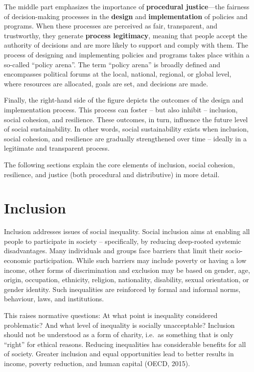 \documentclass[
  a4paper,
  openany]{book}
\begin{document}
The middle part emphasizes the importance of \textbf{procedural
justice}---the fairness of decision-making processes in the
\textbf{design} and \textbf{implementation} of policies and programs.
When these processes are perceived as fair, transparent, and
trustworthy, they generate \textbf{process legitimacy}, meaning that
people accept the authority of decisions and are more likely to support
and comply with them. The process of designing and implementing policies
and programs takes place within a so-called ``policy arena''. The term
``policy arena'' is broadly defined and encompasses political forums at
the local, national, regional, or global level, where resources are
allocated, goals are set, and decisions are made.

Finally, the right-hand side of the figure depicts the outcomes of the
design and implementation process. This process can foster -- but also
inhibit -- inclusion, social cohesion, and resilience. These outcomes,
in turn, influence the future level of social sustainability. In other
words, social sustainability exists when inclusion, social cohesion, and
resilience are gradually strengthened over time -- ideally in a
legitimate and transparent process.

The following sections explain the core elements of inclusion, social
cohesion, resilience, and justice (both procedural and distributive) in
more detail.

\section{Inclusion}\label{inclusion}

Inclusion addresses issues of social inequality. Social inclusion aims
at enabling all people to participate in society -- specifically, by
reducing deep-rooted systemic disadvantages. Many individuals and groups
face barriers that limit their socio-economic participation. While such
barriers may include poverty or having a low income, other forms of
discrimination and exclusion may be based on gender, age, origin,
occupation, ethnicity, religion, nationality, disability, sexual
orientation, or gender identity. Such inequalities are reinforced by
formal and informal norms, behaviour, laws, and institutions.

This raises normative questions: At what point is inequality considered
problematic? And what level of inequality is socially unacceptable?
Inclusion should not be understood as a form of charity, i.e.~as
something that is only ``right'' for ethical reasons. Reducing
inequalities has considerable benefits for all of society. Greater
inclusion and equal opportunities lead to better results in income,
poverty reduction, and human capital (OECD, 2015).
\end{document}
